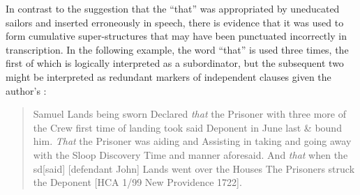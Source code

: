 In contrast to the suggestion that the  “that” was appropriated by uneducated sailors and inserted erroneously in speech, there is evidence that it was used to form cumulative super-structures that may have been punctuated incorrectly in transcription. In the following example, the word “that” is used three times, the first of which is logically interpreted as a subordinator, but the subsequent two might be interpreted as redundant markers of independent clauses given the author’s :

\begin{quotation}
Samuel Lands being sworn Declared \textit{that} the Prisoner with three more of the Crew first time of landing took said Deponent in June last \& bound him. \textit{That} the Prisoner was aiding and Assisting in taking and going away with the Sloop Discovery Time and manner aforesaid. And \textit{that} when the sd[said] [defendant John] Lands went over the Houses The Prisoners struck the Deponent [HCA 1/99 New Providence 1722]. 
\end{quotation}

